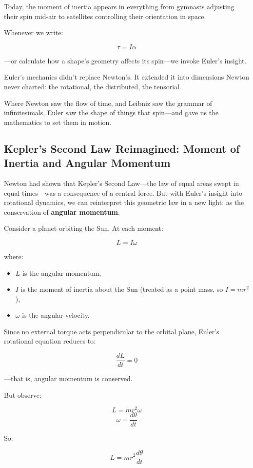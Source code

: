 Today, the moment of inertia appears in everything from gymnasts adjusting their spin mid-air to satellites controlling their orientation in space.

Whenever we write:

\[
\tau = I \alpha
\]

—or calculate how a shape’s geometry affects its spin—we invoke Euler’s insight.

Euler’s mechanics didn’t replace Newton’s. It extended it into dimensions Newton never charted: the rotational, the distributed, the tensorial.

Where Newton saw the flow of time, and Leibniz saw the grammar of infinitesimals, Euler saw the shape of things that spin—and gave us the mathematics to set them in motion.

\subsection{Kepler’s Second Law Reimagined: Moment of Inertia and Angular Momentum}

Newton had shown that Kepler’s Second Law—the law of equal areas swept in equal times—was a consequence of a central force. But with Euler’s insight into rotational dynamics, we can reinterpret this geometric law in a new light: as the conservation of \textbf{angular momentum}.

Consider a planet orbiting the Sun. At each moment:

\[
L = I \omega
\]

where:

\begin{itemize}
    \item \( L \) is the angular momentum,
    \item \( I \) is the moment of inertia about the Sun (treated as a point mass, so \( I = m r^2 \)),
    \item \( \omega \) is the angular velocity.
\end{itemize}

Since no external torque acts perpendicular to the orbital plane, Euler’s rotational equation reduces to:

\[
\frac{dL}{dt} = 0
\]

—that is, angular momentum is conserved.

But observe:

\[
L = m r^2 \omega
\]
\[
\omega = \frac{d\theta}{dt}
\]

So:

\[
L = m r^2 \frac{d\theta}{dt}
\]

